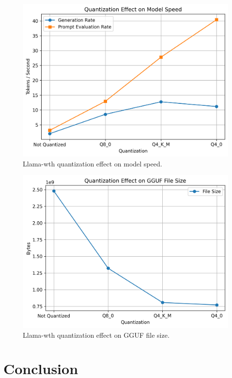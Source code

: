 \documentclass[licencjacka,en]{pracamgr}
\begin{document}
\begin{figure}[htbp]
    \centering
    \includegraphics[width=0.8\linewidth]{bachelor_images/quant_comp/quantization_effect_on_model_speed.png}
    \caption{Llama-wth quantization effect on model speed.}
    \label{fig:quantization_effect_on_model_speed}
\end{figure}

\begin{figure}[htbp]
    \centering
    \includegraphics[width=0.8\linewidth]{bachelor_images/quant_comp/quantization_effect_on_gguf_file_size.png}
    \caption{Llama-wth quantization effect on GGUF file size.}
    \label{fig:quantization_effect_on_gguf_file_size}
\end{figure}

\FloatBarrier

\chapter{Conclusion} \label{chap:conclusion}
\end{document}
